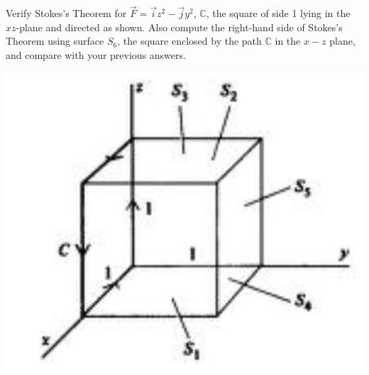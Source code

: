 \documentclass[11pt,letterpaper,boxed]{hmcpset}
\begin{document}
	\begin{problem}  Verify Stokes's Theorem for $\vec{F} = \vec{i} z^2 - \vec{j} y^2$, $\mathbb{C}$, the square of side 1 lying in the $xz$-plane and directed as shown. Also compute the right-hand side of Stokes's Theorem using surface $S_6$, the square enclosed by the path $\mathbb{C}$ in the $x - z$ plane, and compare with your previous answers.
	\begin{center}
		\includegraphics[scale=.5]{51m9pic.jpg}
	\end{center}
	\end{problem}
	\begin{solution}
		\vfill
	\end{solution}
	\newpage
		
	
\end{document}
